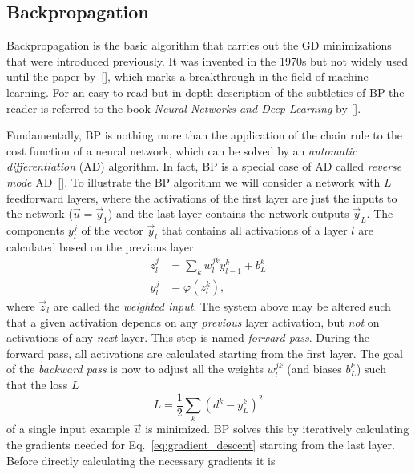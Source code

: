 \subsection{Backpropagation}%
\label{sub:backpropagation}

Backpropagation is the basic algorithm that carries out the GD minimizations
that were introduced previously. It was invented in the 1970s but not widely
used until the paper by~[\cite{rumelhart1986}], which marks a breakthrough in the
field of machine learning.  For an easy to read but in depth description of the
subtleties of BP the reader is referred to the book \emph{Neural Networks and
Deep Learning} by [\cite{Nielsen2015}].

Fundamentally, BP is nothing more than the application of the chain rule to the
cost function of a neural network, which can be solved by an \emph{automatic
differentiation} (AD) algorithm. In fact, BP is a special case of AD called
\emph{reverse mode} AD~[\cite{autodiff}].  To illustrate the BP algorithm we will
consider a network with $L$ feedforward layers, where the activations of the
first layer are just the inputs to the network ($\vec{u} = \vec{y}_1$) and the
last layer contains the network outputs $\vec{y}_L$. The components $y^j_l$ of
the vector $\vec{y}_l$ that contains all activations of a layer $l$ are
calculated based on the previous layer:
\begin{equation}
\begin{aligned}
  z^j_l &= \sum_k w^{jk}_l y^k_{l-1} + b^k_L \\
  y^j_l &= \varphi(z^k_l) \label{eq:forward_pass},
\end{aligned}
\end{equation}
where $\vec{z}_l$ are called the \emph{weighted input}.  The system above may
be altered such that a given activation depends on any \emph{previous} layer
activation, but \emph{not} on activations of any \emph{next} layer. This step is
named \emph{forward pass}.  During the forward pass, all activations are
calculated starting from the first layer. The goal of the \emph{backward pass}
is now to adjust all the weights $w^{jk}_l$ (and biases $b^k_L$) such that the loss $L$
\begin{equation}
  L = \frac{1}{2}\sum_k (d^k - y^k_L)^2
\end{equation}
of a single input example $\vec{u}$ is minimized. BP solves this by iteratively
calculating the gradients needed for Eq.~\ref{eq:gradient_descent} starting
from the last layer.  Before directly calculating the necessary gradients it is
